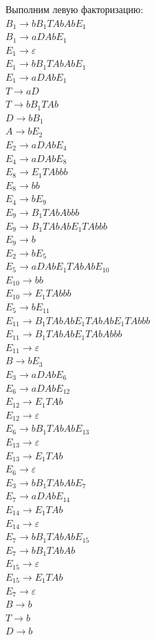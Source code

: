\documentclass[a4paper,14pt]{extarticle}
\begin{document}
\begin{enumerate}[1.]
Выполним левую факторизацию:\\
$B_1 \rightarrow bB_1TAbAbE_1$\\
$B_1 \rightarrow aDAbE_1$\\
$E_1 \rightarrow \varepsilon$\\
$E_1 \rightarrow bB_1TAbAbE_1$\\
$E_1 \rightarrow aDAbE_1$\\
$T \rightarrow aD$\\ 
$T \rightarrow bB_1TAb$\\
$D \rightarrow bB_1$\\
$A \rightarrow bE_2$\\
$E_2 \rightarrow aDAbE_4$\\
$E_4 \rightarrow aDAbE_8$\\
$E_8 \rightarrow E_1TAbbb$\\
$E_8 \rightarrow bb$\\
$E_4 \rightarrow bE_9$\\
$E_9 \rightarrow B_1TAbAbbb$\\
$E_9 \rightarrow B_1TAbAbE_1TAbbb$\\
$E_9 \rightarrow b$\\
$E_2 \rightarrow bE_5$\\
$E_5 \rightarrow aDAbE_1TAbAbE_{10}$\\
$E_{10} \rightarrow bb$\\
$E_{10} \rightarrow E_1TAbbb$\\
$E_5 \rightarrow bE_{11}$\\
$E_{11} \rightarrow B_1TAbAbE_1TAbAbE_1TAbbb$\\
$E_{11} \rightarrow B_1TAbAbE_1TAbAbbb$\\
$E_{11} \rightarrow \varepsilon$\\
$B \rightarrow bE_3$\\ 
$E_3 \rightarrow aDAbE_6$\\
$E_6 \rightarrow aDAbE_{12}$\\ 
$E_{12} \rightarrow E_1TAb$\\
$E_{12} \rightarrow \varepsilon$\\
$E_6 \rightarrow bB_1TAbAbE_{13}$\\ 
$E_{13} \rightarrow \varepsilon$\\ 
$E_{13} \rightarrow E_1TAb$\\
$E_6 \rightarrow \varepsilon$\\ 
$E_3 \rightarrow bB_1TAbAbE_7$\\
$E_7 \rightarrow aDAbE_{14}$\\
$E_{14} \rightarrow E_1TAb$\\
$E_{14} \rightarrow \varepsilon$\\
$E_7 \rightarrow bB_1TAbAbE_{15}$\\
$E_7 \rightarrow bB_1TAbAb$\\
$E_{15} \rightarrow \varepsilon$\\
$E_{15} \rightarrow E_1TAb$\\
$E_7 \rightarrow \varepsilon$\\
$B \rightarrow b$\\
$T \rightarrow b$\\
$D \rightarrow b$\\


\end{enumerate}
\end{document}
